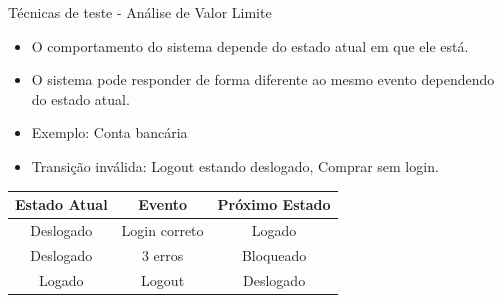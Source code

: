 
\begin{frame}{Técnicas de teste - Análise de Valor Limite}
    \begin{itemize}
        \item O comportamento do sistema depende do estado atual em que ele está.
        \item O sistema pode responder de forma diferente ao mesmo evento dependendo do estado atual.
        \item Exemplo: Conta bancária
        \item Transição inválida: Logout estando deslogado, Comprar sem login. 
    \end{itemize}

    \begin{table}[h]
    \centering
    \begin{tabular}{|c|c|c|}
    \hline
    \textbf{Estado Atual} & \textbf{Evento} & \textbf{Próximo Estado} \\
    \hline
    Deslogado & Login correto & Logado \\
    \hline
    Deslogado & 3 erros & Bloqueado \\
    \hline
    Logado & Logout & Deslogado \\
    \hline
    \end{tabular}
    \end{table}
\end{frame}